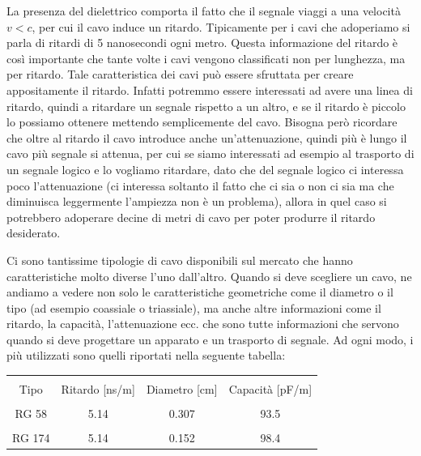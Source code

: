 La presenza del dielettrico comporta il fatto che il segnale viaggi a una velocità $v<c$, per cui il cavo induce un ritardo. Tipicamente per i cavi che adoperiamo si parla di ritardi di 5 nanosecondi ogni metro. Questa informazione del ritardo è così importante che tante volte i cavi vengono classificati non per lunghezza, ma per ritardo. 
Tale caratteristica dei cavi può essere sfruttata per creare appositamente il ritardo. Infatti potremmo essere interessati ad avere una linea di ritardo, quindi a ritardare un segnale rispetto a un altro, e se il ritardo è piccolo lo possiamo ottenere mettendo semplicemente del cavo. Bisogna però ricordare che oltre al ritardo il cavo introduce anche un'attenuazione, quindi più è lungo il cavo più segnale si attenua, per cui se siamo interessati ad esempio al trasporto di un segnale logico e lo vogliamo ritardare, dato che del segnale logico ci interessa poco l'attenuazione (ci interessa soltanto il fatto che ci sia o non ci sia ma che diminuisca leggermente l'ampiezza non è un problema), allora in quel caso si potrebbero adoperare decine di metri di cavo per poter produrre il ritardo desiderato.

Ci sono tantissime tipologie di cavo disponibili sul mercato che hanno caratteristiche molto diverse l'uno dall'altro. Quando si deve scegliere un cavo, ne andiamo a vedere non solo le caratteristiche geometriche come il diametro o il tipo (ad esempio coassiale o triassiale), ma anche altre informazioni come il ritardo, la capacità, l'attenuazione ecc. che sono tutte informazioni che servono quando si deve progettare un apparato e un trasporto di segnale. Ad ogni modo, i più utilizzati sono quelli riportati nella seguente tabella:

\begin{table}[H]
   \centering
   \begin{tabular}{|c|c|c|c|}
      \hline
      &&&\\[-0.3cm]
      Tipo & Ritardo [ns/m] & Diametro [cm] & Capacità [pF/m]\\[0.2cm]
      \hline
      &&&\\[-0.3cm]
      RG 58 & 5.14 & 0.307 & 93.5\\[0.2cm]
      \hline
      &&&\\[-0.3cm]
      RG 174 & 5.14 & 0.152 & 98.4\\[0.2cm]
      \hline
   \end{tabular}
\end{table}

